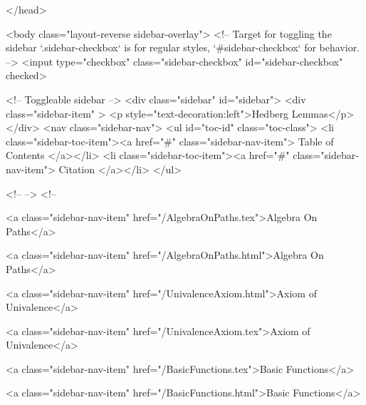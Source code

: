   
</head>




  <body class="layout-reverse sidebar-overlay">
    <!-- Target for toggling the sidebar `.sidebar-checkbox` is for regular
     styles, `#sidebar-checkbox` for behavior. -->
<input type="checkbox" class="sidebar-checkbox" id="sidebar-checkbox" checked>

<!-- Toggleable sidebar -->
<div class="sidebar" id="sidebar">
  <div class="sidebar-item" >
    <p style="text-decoration:left">Hedberg Lemmas</p>
  </div>
  <nav class="sidebar-nav">
    <ul id="toc-id" class="toc-class">
  <li class="sidebar-toc-item"><a href="#" class="sidebar-nav-item"> Table of Contents </a></li>
  <li class="sidebar-toc-item"><a href="#" class="sidebar-nav-item"> Citation </a></li>
</ul>


    <!--  -->
    <!-- 
      
    
      
    
      
    
      
        
      
    
      
        
          <a class="sidebar-nav-item" href="/AlgebraOnPaths.tex">Algebra On Paths</a>
        
      
    
      
        
          <a class="sidebar-nav-item" href="/AlgebraOnPaths.html">Algebra On Paths</a>
        
      
    
      
        
          <a class="sidebar-nav-item" href="/UnivalenceAxiom.html">Axiom of Univalence</a>
        
      
    
      
        
          <a class="sidebar-nav-item" href="/UnivalenceAxiom.tex">Axiom of Univalence</a>
        
      
    
      
        
          <a class="sidebar-nav-item" href="/BasicFunctions.tex">Basic Functions</a>
        
      
    
      
        
          <a class="sidebar-nav-item" href="/BasicFunctions.html">Basic Functions</a>
        
      
    
